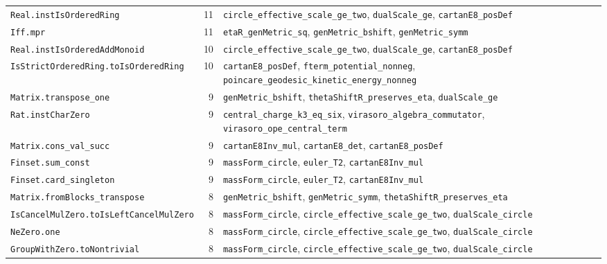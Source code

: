 \begin{longtable}{p{}rp{}}
\texttt{\scriptsize Real.instIsOrderedRing} & 11 & \texttt{\small circle\_effective\_scale\_ge\_two}, \texttt{\small dualScale\_ge}, \texttt{\small cartanE8\_posDef} \\
\texttt{\scriptsize Iff.mpr} & 11 & \texttt{\small etaR\_genMetric\_sq}, \texttt{\small genMetric\_bshift}, \texttt{\small genMetric\_symm} \\
\texttt{\scriptsize Real.instIsOrderedAddMonoid} & 10 & \texttt{\small circle\_effective\_scale\_ge\_two}, \texttt{\small dualScale\_ge}, \texttt{\small cartanE8\_posDef} \\
\texttt{\scriptsize IsStrictOrderedRing.toIsOrderedRing} & 10 & \texttt{\small cartanE8\_posDef}, \texttt{\small fterm\_potential\_nonneg}, \texttt{\small poincare\_geodesic\_kinetic\_energy\_nonneg} \\
\texttt{\scriptsize Matrix.transpose\_one} & 9 & \texttt{\small genMetric\_bshift}, \texttt{\small thetaShiftR\_preserves\_eta}, \texttt{\small dualScale\_ge} \\
\texttt{\scriptsize Rat.instCharZero} & 9 & \texttt{\small central\_charge\_k3\_eq\_six}, \texttt{\small virasoro\_algebra\_commutator}, \texttt{\small virasoro\_ope\_central\_term} \\
\texttt{\scriptsize Matrix.cons\_val\_succ} & 9 & \texttt{\small cartanE8Inv\_mul}, \texttt{\small cartanE8\_det}, \texttt{\small cartanE8\_posDef} \\
\texttt{\scriptsize Finset.sum\_const} & 9 & \texttt{\small massForm\_circle}, \texttt{\small euler\_T2}, \texttt{\small cartanE8Inv\_mul} \\
\texttt{\scriptsize Finset.card\_singleton} & 9 & \texttt{\small massForm\_circle}, \texttt{\small euler\_T2}, \texttt{\small cartanE8Inv\_mul} \\
\texttt{\scriptsize Matrix.fromBlocks\_transpose} & 8 & \texttt{\small genMetric\_bshift}, \texttt{\small genMetric\_symm}, \texttt{\small thetaShiftR\_preserves\_eta} \\
\texttt{\scriptsize IsCancelMulZero.toIsLeftCancelMulZero} & 8 & \texttt{\small massForm\_circle}, \texttt{\small circle\_effective\_scale\_ge\_two}, \texttt{\small dualScale\_circle} \\
\texttt{\scriptsize NeZero.one} & 8 & \texttt{\small massForm\_circle}, \texttt{\small circle\_effective\_scale\_ge\_two}, \texttt{\small dualScale\_circle} \\
\texttt{\scriptsize GroupWithZero.toNontrivial} & 8 & \texttt{\small massForm\_circle}, \texttt{\small circle\_effective\_scale\_ge\_two}, \texttt{\small dualScale\_circle} \\

\end{longtable}
